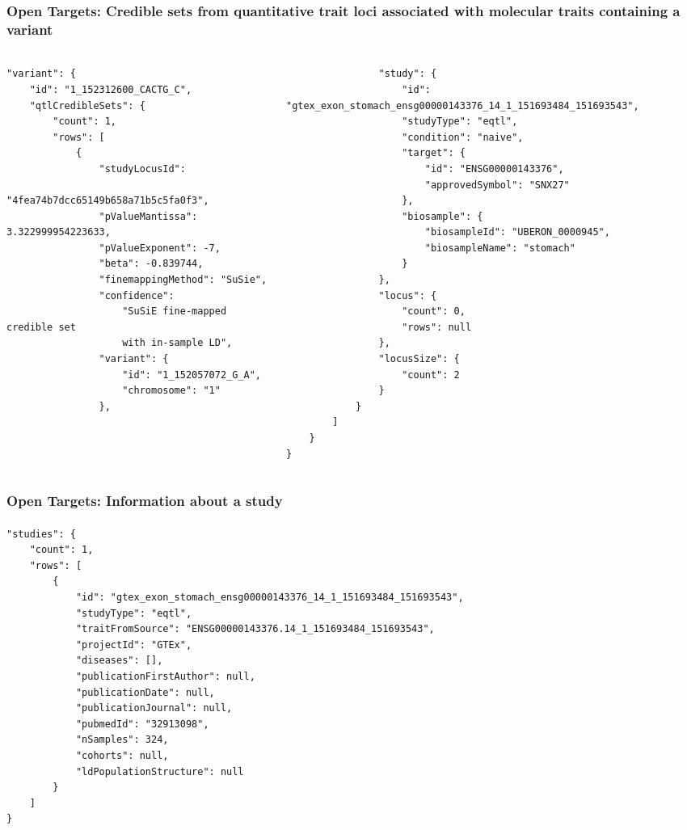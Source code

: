\documentclass[aspectratio=169,xcolor=dvipsnames]{beamer}
\begin{document}
\begin{frame}[fragile,t]
  \frametitle{Open Targets: Credible sets from quantitative trait loci associated with molecular traits containing a variant}
  \framesubtitle{}
  \tiny
  \begin{columns}[t]
    \begin{column}{0.3\textwidth}
\begin{verbatim}
"variant": {
    "id": "1_152312600_CACTG_C",
    "qtlCredibleSets": {
        "count": 1,
        "rows": [
            {
                "studyLocusId":
                    "4fea74b7dcc65149b658a71b5c5fa0f3",
                "pValueMantissa": 3.322999954223633,
                "pValueExponent": -7,
                "beta": -0.839744,
                "finemappingMethod": "SuSie",
                "confidence":
                    "SuSiE fine-mapped credible set
                    with in-sample LD",
                "variant": {
                    "id": "1_152057072_G_A",
                    "chromosome": "1"
                },
\end{verbatim}
    \end{column}
    \begin{column}{0.7\textwidth}
\begin{verbatim}
                "study": {
                    "id": "gtex_exon_stomach_ensg00000143376_14_1_151693484_151693543",
                    "studyType": "eqtl",
                    "condition": "naive",
                    "target": {
                        "id": "ENSG00000143376",
                        "approvedSymbol": "SNX27"
                    },
                    "biosample": {
                        "biosampleId": "UBERON_0000945",
                        "biosampleName": "stomach"
                    }
                },
                "locus": {
                    "count": 0,
                    "rows": null
                },
                "locusSize": {
                    "count": 2
                }
            }
        ]
    }
}
\end{verbatim}
    \end{column}
  \end{columns}
\end{frame}

\begin{frame}[fragile,t]
  \frametitle{Open Targets: Information about a study}
  \framesubtitle{}
  \tiny
\begin{verbatim}
"studies": {
    "count": 1,
    "rows": [
        {
            "id": "gtex_exon_stomach_ensg00000143376_14_1_151693484_151693543",
            "studyType": "eqtl",
            "traitFromSource": "ENSG00000143376.14_1_151693484_151693543",
            "projectId": "GTEx",
            "diseases": [],
            "publicationFirstAuthor": null,
            "publicationDate": null,
            "publicationJournal": null,
            "pubmedId": "32913098",
            "nSamples": 324,
            "cohorts": null,
            "ldPopulationStructure": null
        }
    ]
}
\end{verbatim}
\end{frame}
\end{document}

